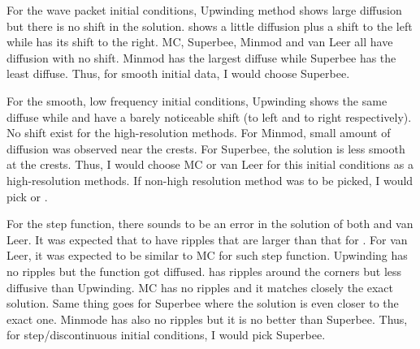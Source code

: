 For the wave packet initial conditions, Upwinding method shows large diffusion but there is no shift in the solution. \protect{\lw} shows a little diffusion plus a shift to the left while \protect{\bw} has its shift to the right. MC, Superbee, Minmod and van Leer all have diffusion with no shift. Minmod has the largest diffuse while Superbee has the least diffuse. Thus, for smooth initial data, I would choose Superbee. 

For the smooth, low frequency initial conditions, Upwinding shows the same diffuse while \protect{\lw} and \protect{\bw} have a barely noticeable shift (to left and to right respectively). No shift exist for the high-resolution methods. For Minmod, small amount of diffusion was observed near the crests. For Superbee, the solution is less smooth at the crests. Thus, I would choose MC or van Leer for this initial conditions as a high-resolution methods. If non-high resolution method was to be picked, I would pick \protect{\lw} or \protect{\bw}.

For the step function, there sounds to be an error in the solution of both \protect{\bw} and van Leer. It was expected that \protect{\lw} to have ripples that are larger than that for \protect{\lw}. For van Leer, it was expected to be similar to MC for such step function. Upwinding has no ripples but the function got diffused. \protect{\lw} has ripples around the corners but less diffusive than Upwinding. MC has no ripples and it matches closely the exact solution. Same thing goes for Superbee where the solution is even closer to the exact one. Minmode has also no ripples but it is no better than Superbee. Thus, for step/discontinuous initial conditions, I would pick Superbee.  